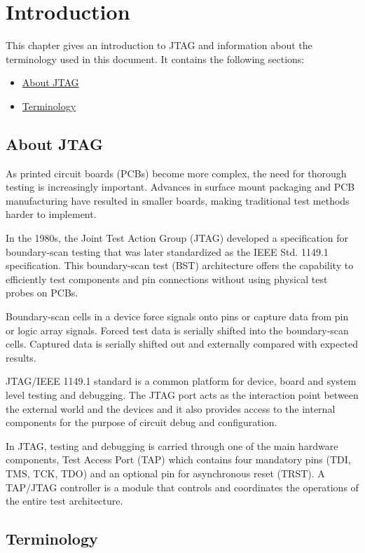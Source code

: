 \chapter{Introduction}
This chapter gives an introduction to JTAG  and information about the terminology used in this document. It contains the following sections:
\begin{itemize}
    \item \hyperref[sec:about-jtag]{About JTAG}
    \item \hyperref[sec:terminology]{Terminology}
\end{itemize}
\newpage

\section{About JTAG}
\label{sec:about-jtag}
As printed circuit boards (PCBs) become more complex, the need for thorough testing is increasingly important. Advances in surface mount packaging and PCB manufacturing have resulted in smaller boards, making traditional test methods harder to implement.

In the 1980s, the Joint Test Action Group (JTAG) developed a specification for boundary-scan testing that was later standardized as the IEEE Std. 1149.1 specification. This boundary-scan test (BST) architecture offers the capability to efficiently test components and pin connections without using physical test probes on PCBs. 

Boundary-scan cells in a device force signals onto pins or capture data from pin or logic array signals. Forced test data is serially shifted into the boundary-scan cells. Captured data is serially shifted out and externally compared with expected results.

JTAG/IEEE 1149.1 standard is a common platform for device, board and system level testing and debugging. The JTAG port acts as the interaction point between the external world and the devices and it also provides access to the internal components for the purpose of circuit debug and configuration.

In JTAG, testing and debugging is carried through one of the main hardware components, Test Access Port (TAP) which contains four mandatory pins (TDI, TMS, TCK, TDO) and an optional pin for asynchronous reset (TRST). A TAP/JTAG controller is a module that controls and coordinates the operations of the entire test architecture.

\section{Terminology}
\label{sec:terminology}